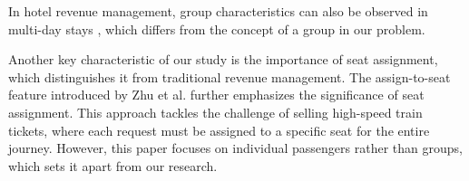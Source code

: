 In hotel revenue management, group characteristics can also be observed in multi-day stays \cite{aydin2018decomposition, bitran1995application}, which differs from the concept of a group in our problem.

Another key characteristic of our study is the importance of seat assignment, which distinguishes it from traditional revenue management. The assign-to-seat feature introduced by Zhu et al. \cite{zhu2023assign} further emphasizes the significance of seat assignment. This approach tackles the challenge of selling high-speed train tickets, where each request must be assigned to a specific seat for the entire journey. However, this paper focuses on individual passengers rather than groups, which sets it apart from our research.















\newpage
